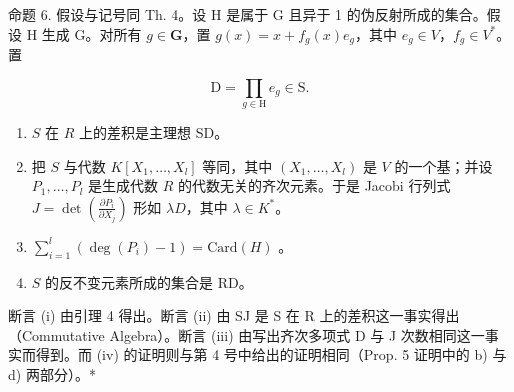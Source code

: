 命题 6. 假设与记号同 Th. 4。设 H 是属于 G 且异于 1 的伪反射所成的集合。假设 H 生成 G。对所有 \(g \in \mathbf{G}\)，置 \(g(x) = x + f_g(x)e_g\)，其中 \(e_g \in V\)，\(f_g \in V^*\)。置

\[
\mathrm{D} = \prod_ {g \in \mathrm{H}} e _ {g} \in \mathrm{S}.
\]

\begin{enumerate}
\def\labelenumi{(\roman{enumi})}
\item
  \(S\) 在 \(R\) 上的差积是主理想 SD。
\item
  把 \(S\) 与代数 \(K[X_1, \ldots, X_l]\) 等同，其中 \((X_1, \ldots, X_l)\) 是 \(V\) 的一个基；并设 \(P_1, \ldots, P_l\) 是生成代数 \(R\) 的代数无关的齐次元素。于是 Jacobi 行列式 \(J = \det\left(\frac{\partial P_i}{\partial X_j}\right)\) 形如 \(\lambda D\)，其中 \(\lambda \in K^*\)。
\item
  \(\sum_{i=1}^{l} (\deg(P_i) - 1) = \text{Card}(H)\) 。
\item
  \(S\) 的反不变元素所成的集合是 RD。
\end{enumerate}

断言 (i) 由引理 4 得出。断言 (ii) 由 SJ 是 S 在 R 上的差积这一事实得出（Commutative Algebra）。断言 (iii) 由写出齐次多项式 D 与 J 次数相同这一事实而得到。而 (iv) 的证明则与第 4 号中给出的证明相同（Prop. 5 证明中的 b) 与 d) 两部分）。*

